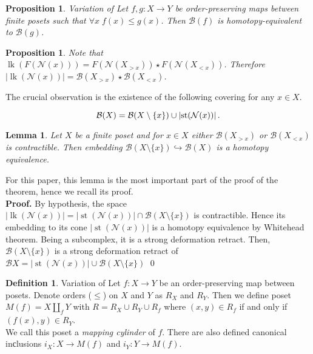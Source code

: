 \documentclass[english,12pt]{article}
\newcounter{stmcounter}[section]
\numberwithin{equation}{section}
\newtheorem{proposition}[stmcounter]{Proposition}
\newtheorem{lemma}[stmcounter]{Lemma}
\theoremstyle{definition}
\newtheorem{definition}[stmcounter]{Definition}
\theoremstyle{remark}
\newenvironment{pf}{\noindent\textbf{Proof.}}{\qed}
\newcommand{\define}[1]{{\textit{#1}}}
\renewcommand{\leq}{\leqslant}
\begin{document}
\begin{proposition} {Variation of \cite[Lemma 2.2]{Bar11}}
  \label{prop:comparison}
  Let $f,g : X \to Y$ be order-preserving maps between finite posets such that $\forall x\;f(x) \leq g(x)$. Then $\mathcal{B}(f)$ is homotopy-equivalent to $\mathcal{B}(g)$.
\end{proposition}

\begin{proposition}
  Note that $\operatorname{lk}(F(\mathcal{N}(x))) = F(\mathcal{N}(X_{>x})) \star F(\mathcal{N}(X_{<x}))$. Therefore $\left|\operatorname{lk}(\mathcal{N}(x))\right| = \mathcal{B}(X_{>x}) \star \mathcal{B}(X_{<x})$.
\end{proposition}

The crucial observation is the existence of the following covering for any $x \in X$.

\begin{equation}\label{covering}
  \mathcal{B}(X) = \mathcal{B}(X \setminus \{x\}) \cup \left|\operatorname{st}(\mathcal{N}(x))\right|.\\
\end{equation}

\begin{lemma}
  \label{lem:homotopy}
  Let $X$ be a finite poset and for $x \in X$ either $\mathcal{B}(X_{>x})$ or $\mathcal{B}(X_{<x})$ is contractible. Then embedding $\mathcal{B}(X \setminus \{x\}) \hookrightarrow \mathcal{B}(X)$ is a homotopy equivalence.
\end{lemma}

For this paper, this lemma is the most important part of the proof of the theorem, hence we recall its proof.\\

\begin{pf}
  By hypothesis, the space $\left|\operatorname{lk}(\mathcal{N}(x))\right| = \left|\operatorname{st}(\mathcal{N}(x))\right| \cap \mathcal{B}(X \setminus \{x\})$ is contractible. Hence its embedding to its cone $\left|\operatorname{st}(\mathcal{N}(x))\right|$ is a homotopy equivalence by Whitehead theorem. Being a subcomplex, it is a strong deformation retract. Then, $\mathcal{B}(X \setminus \{x\})$ is a strong deformation retract of $\mathcal{B}X = \left|\operatorname{st}(\mathcal{N}(x))\right| \cup \mathcal{B}(X \setminus \{x\})$
\end{pf}

\begin{definition} {Variation of \cite[Proposition 2.1]{Bar11}}
  Let $f : X \to Y$ be an order-preserving map between posets. Denote orders ($\leq$) on $X$ and $Y$ as $R_X$ and $R_Y$. Then we define poset $M(f) = X \coprod_f Y$ with $R = R_X \cup R_Y \cup R_{f}$ where $(x,y) \in R_f$ if and only if $(f(x),y) \in R_Y$.\\

  We call this poset a \define{mapping cylinder} of $f$. There are also defined canonical inсlusions $i_X : X \to M(f)$ and $i_Y : Y \to M(f)$.
\end{definition}
\end{document}
